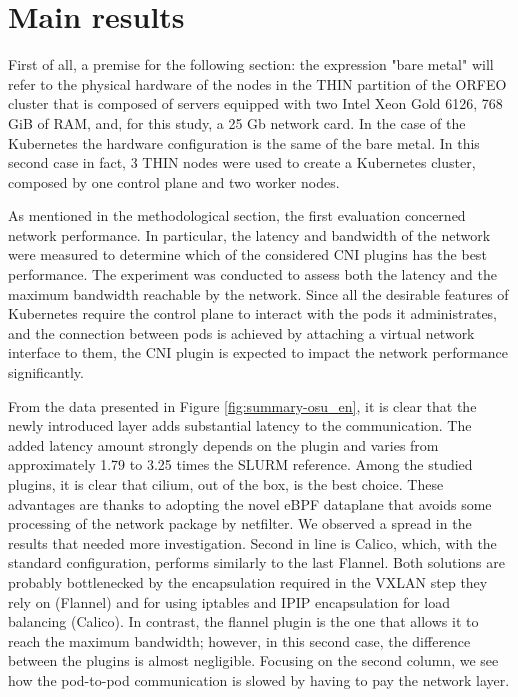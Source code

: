 \section*{Main results}

First of all, a premise for the following section: the expression "bare metal"
will refer to the physical hardware of the nodes in the THIN partition of the
ORFEO cluster that is composed of servers equipped with two Intel Xeon Gold
6126, 768 GiB of RAM, and, for this study, a 25 Gb network card.
In the case of the Kubernetes the hardware configuration is the same of the bare
metal. In this second case in fact, 3 THIN nodes were used to create a
Kubernetes cluster, composed by one control plane and two worker nodes.

As mentioned in the methodological section, the first evaluation concerned
network performance. In particular, the latency and bandwidth of the network
were measured to determine which of the considered CNI plugins has the best
performance. The experiment was conducted to assess both the latency and the
maximum bandwidth reachable by the network. Since all the desirable features of
Kubernetes require the control plane to interact with the pods it administrates,
and the connection between pods is achieved by attaching a virtual network
interface to them, the CNI plugin is expected to impact the network performance
significantly.

From the data presented in Figure \ref{fig:summary-osu_en}, it is clear that the
newly introduced layer adds substantial latency to the communication. The added
latency amount strongly depends on the plugin and varies from approximately 1.79
to 3.25 times the SLURM reference. Among the studied plugins, it is clear that
cilium, out of the box, is the best choice. These advantages are thanks to
adopting the novel eBPF dataplane that avoids some processing of the network
package by netfilter. We observed a spread in the results that needed more
investigation. Second in line is Calico, which, with the standard configuration,
performs similarly to the last Flannel.
Both solutions are probably bottlenecked by the encapsulation required in the
VXLAN step they rely on (Flannel) and for using iptables and IPIP encapsulation
for load balancing (Calico).
In contrast, the flannel plugin is the one that allows it to reach the maximum
bandwidth; however, in this second case, the difference between the plugins is
almost negligible. Focusing on the second column, we see how the pod-to-pod
communication is slowed by having to pay the network layer.

